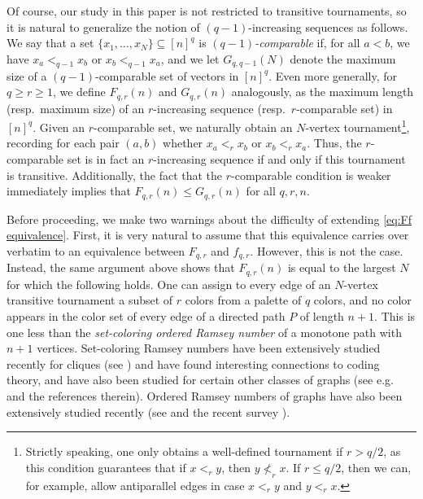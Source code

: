 \documentclass[11pt,reqno]{amsart}
\theoremstyle{definition}
\newcommand\1{\mathbf{1}}
\let\leq\leqslant
\let\geq\geqslant
\begin{document}
Of course, our study in this paper is not restricted to transitive tournaments, so it is natural to generalize the notion of $(q-1)$-increasing sequences as follows. We say that a set $\{x_1,\dots,x_N\} \subseteq [n]^q$ is \emph{$(q-1)$-comparable} if, for all $a<b$, we have $x_a<_{q-1} x_b$ or $x_b <_{q-1} x_a$, and we let $G_{q,q-1}(N)$ denote the maximum size of a $(q-1)$-comparable set of vectors in $[n]^q$. Even more generally, for $q \geq r \geq 1$, we define $F_{q,r}(n)$ and $G_{q,r}(n)$ analogously, as the maximum length (resp.\ maximum size) of an $r$-increasing sequence (resp.\ $r$-comparable set) in $[n]^q$.
Given an $r$-comparable set, we naturally obtain an $N$-vertex tournament\footnote{Strictly speaking, one only obtains a well-defined tournament if $r>q/2$, as this condition guarantees that if $x <_r y$, then $y \not<_r x$. If $r \leq q/2$, then we can, for example, allow antiparallel edges in case $x<_r y$ and $y<_r x$.}, recording for each pair $(a,b)$ whether $x_a <_r x_b$ or $x_b <_r x_a$. Thus, the $r$-comparable set is in fact an $r$-increasing sequence if and only if this tournament is transitive. Additionally, the fact that the $r$-comparable condition is weaker immediately implies that $F_{q,r}(n) \leq G_{q,r}(n)$ for all $q,r,n$.

Before proceeding, we make two warnings about the difficulty of extending \eqref{eq:Ff equivalence}. First, it is very natural to assume that this equivalence carries over verbatim to an equivalence between $F_{q,r}$ and $f_{q,r}$. However, this is not the case. 
Instead, the same argument above shows that $F_{q,r}(n)$ is equal to the largest $N$ for which the following holds. One can assign to every edge of an $N$-vertex transitive tournament a subset of $r$ colors from a palette of $q$ colors, and no color appears in the color set of every edge of a directed path $P$ of length $n+1$. This is one less than the \textit{set-coloring ordered Ramsey number} of a monotone path with $n+1$ vertices. Set-coloring Ramsey numbers have been extensively studied recently for cliques (see \cite{MR4752601,MR4751635,MR4704267}) and have found interesting connections to coding theory, and have also been studied for certain other classes of graphs (see e.g.\ \cite{MR4563218} and the references therein). Ordered Ramsey numbers of graphs have also been extensively studied recently (see \cite{MR3575208,MR4057168} and the recent survey \cite{2502.02155}). 
\end{document}
